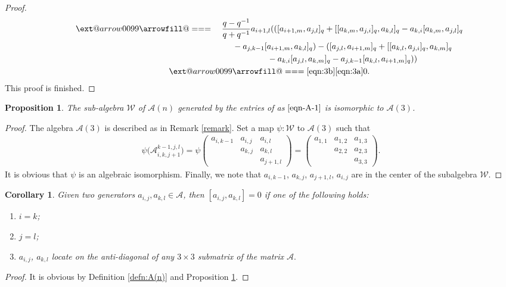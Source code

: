 \documentclass[10pt,a4paper]{amsart}
\makeatletter
\def\x@arrow{\DOTSB\Relbar}
\def\xlongequalsignfill@{\arrowfill@\x@arrow\Relbar\x@arrow}
\providecommand{\xlongequal}[2][]{%
	\ext@arrow 0099\xlongequalsignfill@{#1}{#2}}
\numberwithin{equation}{section}
\def\A{\mathscr{A}}
\newtheorem{Corollary}[Theorem]{Corollary}
\newtheorem{Proposition}[Theorem]{Proposition}
 { \theoremstyle{definition}
\newtheorem{Definition}[Theorem]{Definition}
\newtheorem{Note}[Theorem]{Note}
\newtheorem{Example}[Theorem]{Example}
\newtheorem{Remark}[Theorem]{Remark} }
\makeatother
\begin{document}
\begin{proof}
\begin{gather*}
\qquad \xlongequal{\quad} \frac{q-q^{-1}}{q+q^{-1}}a_{i+1,l} ( ( [a_{i+1,m}, a_{j,l} ]_q+ [ [a_{k,m}, a_{j,i} ]_q,a_{k,l} ]_q- a_{k,i} [a_{k,m}, a_{j,l} ]_q \\
 \phantom{\qquad \xlongequal{\quad}}{} -a_{j,k-1} [a_{i+1,m}, a_{k,l} ]_q )- ( [a_{j,l}, a_{i+1,m} ]_q+ [ [a_{k,l}, a_{j,i} ]_q,a_{k,m} ]_q
\\
 \phantom{\qquad \xlongequal{\quad}}{} -a_{k,i} [a_{j,l}, a_{k,m} ]_q-a_{j,k-1} [a_{k,l}, a_{i+1,m} ]_q ) )\\
\qquad \xlongequal[\eqref{eqn:3b}]{\eqref{eqn:3a}} 0.
\end{gather*}
This proof is finished.
\end{proof}
\begin{Proposition}\label{prop:3}
The sub-algebra $\mathcal{W}$ of $\A(n)$ generated by the entries of \smash{$\A_{i,k,j+1}^{k-1,j,l}$} as $\eqref{eqn-A-1}$ is isomorphic to $\A(3)$.
\end{Proposition}
\begin{proof}
The algebra $\A(3)$ is described as in Remark \ref{remark}.
Set a map $\psi\colon\mathcal{W}$ to $\A(3)$ such that
\begin{gather*}
\psi\bigl(\A_{i,k,j+1}^{k-1,j,l}\bigr)=\psi\begin{pmatrix}
a_{i,k-1}& a_{i,j}&a_{i,l}\\
& a_{k,j}&a_{k,l}\\
& &a_{j+1,l}
\end{pmatrix}
=\begin{pmatrix}
a_{1,1}& a_{1,2}&a_{1,3}\\
& a_{2,2}&a_{2,3}\\
& &a_{3,3}
\end{pmatrix}.
\end{gather*}
It is obvious that $\psi$ is an algebraic isomorphism.
Finally, we note that $a_{i,k-1}$, $a_{k,j}$, $a_{j+1,l}$, $a_{i,j}$ are in the center of the subalgebra $\mathcal{W}$.
\end{proof}
\begin{Corollary}\label{cor:comm}
Given two generators $a_{i,j}, a_{k,l} \in \A$, then $[a_{i,j}, a_{k,l}]=0$ if one of the following holds:
\begin{enumerate}\itemsep=0pt
 \item[$(1)$] $i = k$;
 \item[$(2)$] $j = l$;
 \item[$(3)$] $a_{i,j}$, $a_{k,l}$ locate on the anti-diagonal of any $3\times 3$ submatrix of the matrix $\A.$
\end{enumerate}
\end{Corollary}
\begin{proof}
It is obvious by Definition \ref{defn:A(n)} and Proposition \ref{prop:3}.
\end{proof}
\end{document}
